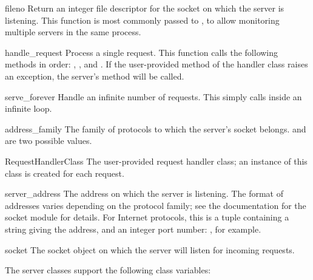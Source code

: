 \begin{funcdesc}{fileno}{}
Return an integer file descriptor for the socket on which the server
is listening.  This function is most commonly passed to
, to allow monitoring multiple servers in the
same process.
\end{funcdesc}

\begin{funcdesc}{handle_request}{}
Process a single request.  This function calls the following methods
in order: , , and
.  If the user-provided 
method of the handler class raises an exception, the server's
 method will be called.
\end{funcdesc}

\begin{funcdesc}{serve_forever}{}
Handle an infinite number of requests.  This simply calls
 inside an infinite loop.
\end{funcdesc}

\begin{datadesc}{address_family}
The family of protocols to which the server's socket belongs.
 and  are two
possible values.
\end{datadesc}

\begin{datadesc}{RequestHandlerClass}
The user-provided request handler class; an instance of this class is
created for each request.
\end{datadesc}

\begin{datadesc}{server_address}
The address on which the server is listening.  The format of addresses
varies depending on the protocol family; see the documentation for the
socket module for details.  For Internet protocols, this is a tuple
containing a string giving the address, and an integer port number:
, for example.
\end{datadesc}

\begin{datadesc}{socket}
The socket object on which the server will listen for incoming requests.
\end{datadesc}


The server classes support the following class variables:

